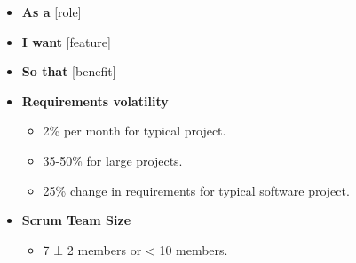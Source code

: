 \documentclass[10pt]{article}
\begin{document}
\begin{multicols}{5}
\begin{block}
  \begin{itemize}
    \item \textbf{As a} [role]
    \item \textbf{I want} [feature]
    \item \textbf{So that} [benefit]
  \end{itemize}
\end{block}


\begin{block}
  \begin{itemize}
    \item \textbf{Requirements volatility}
    \begin{itemize}
      \item 2\% per month for typical project.
      \item 35-50\% for large projects.
      \item 25\% change in requirements for typical software project.
    \end{itemize}
    \item \textbf{Scrum Team Size}
    \begin{itemize}
      \item 7 ± 2 members or < 10 members.
    \end{itemize}
  \end{itemize}
  \end{block}


\end{multicols}
\end{document}
